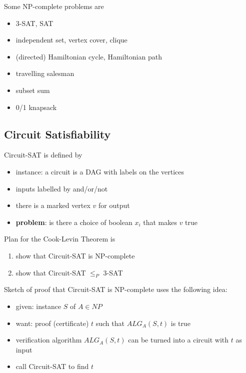 \documentclass[11pt]{article}
\begin{document}
Some NP-complete problems are
\begin{itemize}
\item 3-SAT, SAT
\item independent set, vertex cover, clique
\item (directed) Hamiltonian cycle, Hamiltonian path
\item travelling salesman
\item subset sum
\item 0/1 knapsack
\end{itemize}
\subsection{Circuit Satisfiability}
\label{sec:org9da4aff}
Circuit-SAT is defined by
\begin{itemize}
\item instance: a circuit is a DAG with labels on the vertices
\item inputs labelled by and/or/not
\item there is a marked vertex \(v\) for output
\item \textbf{problem}: is there a choice of boolean \(x_{i}\) that makes \(v\) true
\end{itemize}

Plan for the Cook-Levin Theorem is
\begin{enumerate}
\item show that Circuit-SAT is NP-complete
\item show that Circuit-SAT \(\le_{P}\) 3-SAT
\end{enumerate}

Sketch of proof that Circuit-SAT is NP-complete uses the following idea:
\begin{itemize}
\item given: instance \(S\) of \(A \in NP\)
\item want: proof (certificate) \(t\) such that \(ALG_{A}(S,t)\) is true
\item verification algorithm \(ALG_{A}(S,t)\) can be turned into a circuit with \(t\) as input
\item call Circuit-SAT to find \(t\)
\end{itemize}
\end{document}

